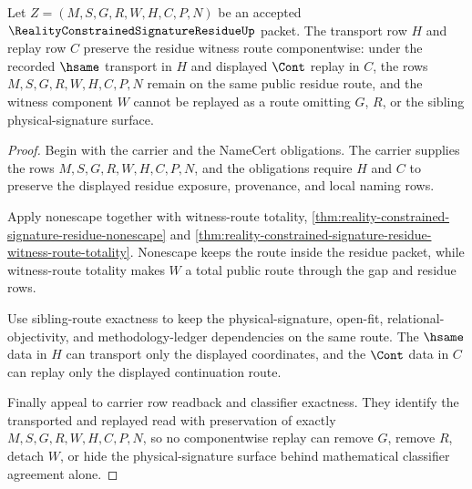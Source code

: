 \begin{theorem}
\label{thm:reality-constrained-signature-residue-witness-replay-stability}
Let $Z=(M,S,G,R,W,H,C,P,N)$ be an accepted $\RealityConstrainedSignatureResidueUp$ packet. The transport row $H$ and replay row $C$ preserve the residue witness route componentwise: under the recorded $\hsame$ transport in $H$ and displayed $\Cont$ replay in $C$, the rows $M,S,G,R,W,H,C,P,N$ remain on the same public residue route, and the witness component $W$ cannot be replayed as a route omitting $G$, $R$, or the sibling physical-signature surface.
\end{theorem}
\begin{proof}
Begin with the carrier and the NameCert obligations. The carrier supplies the rows $M,S,G,R,W,H,C,P,N$, and the obligations require $H$ and $C$ to preserve the displayed residue exposure, provenance, and local naming rows.

Apply nonescape together with witness-route totality,
\autoref{thm:reality-constrained-signature-residue-nonescape} and
\autoref{thm:reality-constrained-signature-residue-witness-route-totality}. Nonescape keeps the route inside the residue packet, while witness-route totality makes $W$ a total public route through the gap and residue rows.

Use sibling-route exactness to keep the physical-signature, open-fit, relational-objectivity, and methodology-ledger dependencies on the same route. The $\hsame$ data in $H$ can transport only the displayed coordinates, and the $\Cont$ data in $C$ can replay only the displayed continuation route.

Finally appeal to carrier row readback and classifier exactness. They identify the transported and replayed read with preservation of exactly $M,S,G,R,W,H,C,P,N$, so no componentwise replay can remove $G$, remove $R$, detach $W$, or hide the physical-signature surface behind mathematical classifier agreement alone.
\end{proof}

